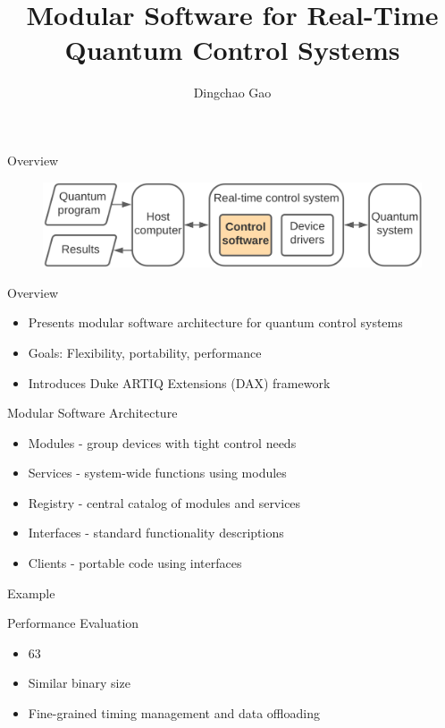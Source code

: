 \documentclass[18 pt]{beamer}
\title{Modular Software for Real-Time Quantum Control Systems}
\author[Gcc]{Dingchao Gao}
\institute[ISCAS]{Institute of Software Chinese Academy of Sciences}
\begin{document}
\frame{\titlepage}

\begin{frame}{Overview}
  \begin{figure}
    \includegraphics[width=.8\textwidth]{real-time.png}
  \end{figure}
\end{frame}
\begin{frame}{Overview}
\begin{itemize}
\item Presents modular software architecture for quantum control systems
\item Goals: Flexibility, portability, performance
\item Introduces Duke ARTIQ Extensions (DAX) framework
\end{itemize}
\end{frame}

\begin{frame}{Modular Software Architecture}
\begin{itemize}
\item Modules - group devices with tight control needs
\item Services - system-wide functions using modules
\item Registry - central catalog of modules and services
\item Interfaces - standard functionality descriptions
\item Clients - portable code using interfaces
\end{itemize}
\end{frame}
\begin{frame}{Example}
  
\end{frame}
\begin{frame}{Performance Evaluation}
\begin{itemize}
\item 63%
\item Similar binary size
\item Fine-grained timing management and data offloading
\end{itemize}
\end{frame}
\end{document}
